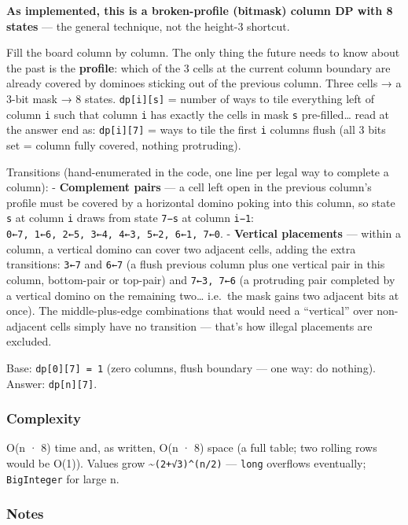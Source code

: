 \documentclass[
  10pt,
  letterpaper,
  onecolumn]{article}
\begin{document}
\textbf{As implemented, this is a broken-profile (bitmask) column DP
with 8 states} --- the general technique, not the height-3 shortcut.

Fill the board column by column. The only thing the future needs to know
about the past is the \textbf{profile}: which of the 3 cells at the
current column boundary are already covered by dominoes sticking out of
the previous column. Three cells → a 3-bit mask → 8 states.
\texttt{dp{[}i{]}{[}s{]}} = number of ways to tile everything left of
column \texttt{i} such that column \texttt{i} has exactly the cells in
mask \texttt{s} pre-filled\ldots{} read at the answer end as:
\texttt{dp{[}i{]}{[}7{]}} = ways to tile the first \texttt{i} columns
flush (all 3 bits set = column fully covered, nothing protruding).

Transitions (hand-enumerated in the code, one line per legal way to
complete a column): - \textbf{Complement pairs} --- a cell left open in
the previous column's profile must be covered by a horizontal domino
poking into this column, so state \texttt{s} at column \texttt{i} draws
from state \texttt{7−s} at column \texttt{i−1}:
\texttt{0←7,\ 1←6,\ 2←5,\ 3←4,\ 4←3,\ 5←2,\ 6←1,\ 7←0}. -
\textbf{Vertical placements} --- within a column, a vertical domino can
cover two adjacent cells, adding the extra transitions: \texttt{3←7} and
\texttt{6←7} (a flush previous column plus one vertical pair in this
column, bottom-pair or top-pair) and \texttt{7←3,\ 7←6} (a protruding
pair completed by a vertical domino on the remaining two\ldots{}
i.e.~the mask gains two adjacent bits at once). The middle-plus-edge
combinations that would need a ``vertical'' over non-adjacent cells
simply have no transition --- that's how illegal placements are
excluded.

Base: \texttt{dp{[}0{]}{[}7{]}\ =\ 1} (zero columns, flush boundary ---
one way: do nothing). Answer: \texttt{dp{[}n{]}{[}7{]}}.

\hypertarget{complexity-10}{%
\subsubsection{Complexity}\label{complexity-10}}

O(n · 8) time and, as written, O(n · 8) space (a full table; two rolling
rows would be O(1)). Values grow
\textasciitilde{}\texttt{(2+√3)\^{}(n/2)} --- \texttt{long} overflows
eventually; \texttt{BigInteger} for large n.

\hypertarget{notes-8}{%
\subsubsection{Notes}\label{notes-8}}
\end{document}
